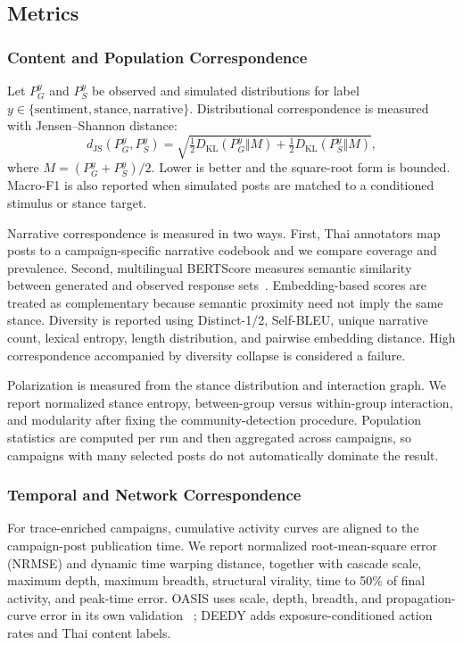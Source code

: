 \documentclass[conference]{IEEEtran}
\begin{document}
\subsection{Metrics}

\subsubsection{Content and Population Correspondence}

Let $P_G^y$ and $P_S^y$ be observed and simulated distributions for label
$y\in\{\text{sentiment},\text{stance},\text{narrative}\}$. Distributional
correspondence is measured with Jensen--Shannon distance:
\begin{equation}
 d_{\mathrm{JS}}(P_G^y,P_S^y)=
 \sqrt{\tfrac{1}{2}D_{\mathrm{KL}}(P_G^y\Vert M)+
 \tfrac{1}{2}D_{\mathrm{KL}}(P_S^y\Vert M)},
\end{equation}
where $M=(P_G^y+P_S^y)/2$. Lower is better and the square-root form is bounded.
Macro-F1 is also reported when simulated posts are matched to a conditioned
stimulus or stance target.

Narrative correspondence is measured in two ways. First, Thai annotators map
posts to a campaign-specific narrative codebook and we compare coverage and
prevalence. Second, multilingual BERTScore measures semantic similarity between
generated and observed response sets~\cite{zhang2020bertscore}. Embedding-based
scores are treated as complementary because semantic proximity need not imply
the same stance. Diversity is reported using Distinct-1/2, Self-BLEU, unique
narrative count, lexical entropy, length distribution, and pairwise embedding
distance. High correspondence accompanied by diversity collapse is considered
a failure.

Polarization is measured from the stance distribution and interaction graph.
We report normalized stance entropy, between-group versus within-group
interaction, and modularity after fixing the community-detection procedure.
Population statistics are computed per run and then aggregated across
campaigns, so campaigns with many selected posts do not automatically dominate
the result.

\subsubsection{Temporal and Network Correspondence}

For trace-enriched campaigns, cumulative activity curves are aligned to the
campaign-post publication time. We report normalized root-mean-square error
(NRMSE) and dynamic time
warping distance, together with cascade scale, maximum depth, maximum breadth,
structural virality, time to 50\% of final activity, and peak-time error. OASIS
uses scale, depth, breadth, and propagation-curve error in its own validation
~\cite{yang2024oasis}; DEEDY adds exposure-conditioned action rates and Thai
content labels.
\end{document}
